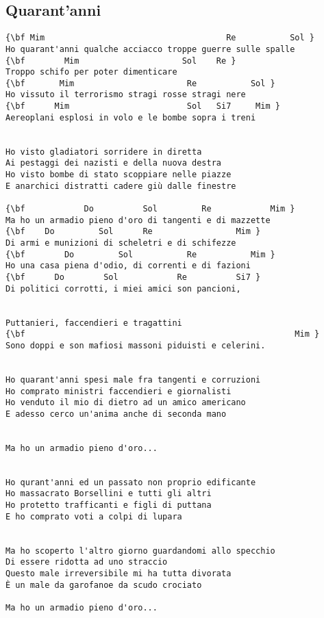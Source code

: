 \documentclass[a4paper]{article}
\begin{document}
\newpage
\subsection{Quarant'anni} %
\label{sub:Quarant'anni}
\begin{Verbatim}[commandchars=\\\{\}]
{\bf Mim                                     Re           Sol }
Ho quarant'anni qualche acciacco troppe guerre sulle spalle 
{\bf        Mim                     Sol    Re }
Troppo schifo per poter dimenticare 
{\bf       Mim                       Re           Sol }
Ho vissuto il terrorismo stragi rosse stragi nere 
{\bf      Mim                        Sol   Si7     Mim }
Aereoplani esplosi in volo e le bombe sopra i treni 


Ho visto gladiatori sorridere in diretta 
Ai pestaggi dei nazisti e della nuova destra 
Ho visto bombe di stato scoppiare nelle piazze 
E anarchici distratti cadere giù dalle finestre 

{\bf            Do          Sol         Re            Mim }
Ma ho un armadio pieno d'oro di tangenti e di mazzette 
{\bf    Do         Sol      Re                 Mim }
Di armi e munizioni di scheletri e di schifezze 
{\bf        Do         Sol           Re           Mim }
Ho una casa piena d'odio, di correnti e di fazioni 
{\bf      Do        Sol            Re          Si7 }
Di politici corrotti, i miei amici son pancioni, 


Puttanieri, faccendieri e tragattini 
{\bf                                                       Mim }
Sono doppi e son mafiosi massoni piduisti e celerini. 


Ho quarant'anni spesi male fra tangenti e corruzioni 
Ho comprato ministri faccendieri e giornalisti 
Ho venduto il mio di dietro ad un amico americano 
E adesso cerco un'anima anche di seconda mano 


Ma ho un armadio pieno d'oro...


Ho qurant'anni ed un passato non proprio edificante 
Ho massacrato Borsellini e tutti gli altri 
Ho protetto trafficanti e figli di puttana 
E ho comprato voti a colpi di lupara 


Ma ho scoperto l'altro giorno guardandomi allo specchio 
Di essere ridotta ad uno straccio 
Questo male irreversibile mi ha tutta divorata 
È un male da garofanoe da scudo crociato 

Ma ho un armadio pieno d'oro...
\end{Verbatim}
\newpage
\end{document}
